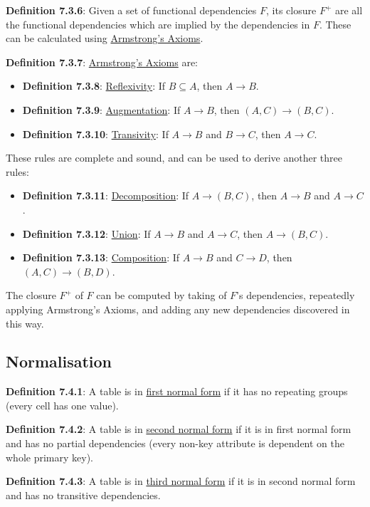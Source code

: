 \documentclass{article}
\newcommand{\separate}[1] {\vspace{#1 pt}\noindent}
\newcommand{\definition}[2]{\textbf{Definition #1}: #2\label{def:#1}}
\begin{document}
\separate{5}\definition{7.3.6}{Given a set of functional dependencies \(F\), its closure \(F^+\) are all the functional dependencies which are implied by the dependencies in \(F\). These can be calculated using \hyperref[def:7.3.7]{Armstrong's Axioms}.}

\newpage\noindent\definition{7.3.7}{\underline{Armstrong's Axioms} are: 
\begin{itemize}
    \item \definition{7.3.8}{\underline{Reflexivity}: If \(B \subseteq A\), then \(A \rightarrow B\).}
    \item \definition{7.3.9}{\underline{Augmentation}: If \(A \rightarrow B\), then \((A,C) \rightarrow (B,C)\).}
    \item \definition{7.3.10}{\underline{Transivity}: If \(A \rightarrow B\) and \(B \rightarrow C\), then \(A \rightarrow C\).}
\end{itemize}} 
These rules are complete and sound, and can be used to derive another three rules:
\begin{itemize}
    \item \definition{7.3.11}{\underline{Decomposition}: If \(A \rightarrow (B,C)\), then \(A \rightarrow B\) and \(A \rightarrow C\).}
    \item \definition{7.3.12}{\underline{Union}: If \(A \rightarrow B\) and \(A \rightarrow C\), then \(A \rightarrow (B,C)\).}
    \item \definition{7.3.13}{\underline{Composition}: If \(A \rightarrow B\) and \(C \rightarrow D\), then \((A,C) \rightarrow (B,D)\).}
\end{itemize}

\separate{5}The closure \(F^+\) of \(F\) can be computed by taking of \(F\)'s dependencies, repeatedly applying Armstrong's Axioms, and adding any new dependencies discovered in this way.

\subsection{Normalisation}

\definition{7.4.1}{A table is in \underline{first normal form} if it has no repeating groups (every cell has one value).}

\separate{5}\definition{7.4.2}{A table is in \underline{second normal form} if it is in first normal form and has no partial dependencies (every non-key attribute is dependent on the whole primary key).}

\separate{5}\definition{7.4.3}{A table is in \underline{third normal form} if it is in second normal form and has no transitive dependencies.}
\end{document}
